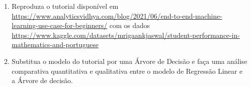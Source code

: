 \documentclass{article}
\begin{document}
    \begin{enumerate}
        \item Reproduza o tutorial disponível em \url{https://www.analyticsvidhya.com/blog/2021/06/end-to-end-machine-learning-use-case-for-beginners/} com os dados \url{https://www.kaggle.com/datasets/mrigaankjaswal/student-performance-in-mathematics-and-portuguese}
        \item Substitua o modelo do tutorial por uma Árvore de Decisão e faça uma análise comparativa quantitativa e qualitativa entre o modelo de Regressão Linear e a Árvore de decisão.
    \end{enumerate}

    






%
%
\end{document}
